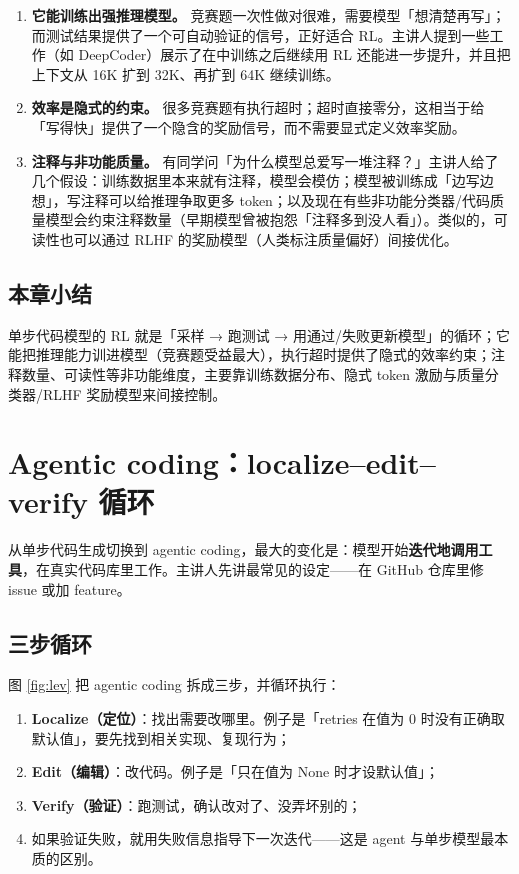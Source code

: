 ﻿\documentclass[a4paper]{article}
\begin{document}
\begin{enumerate}
\item \textbf{它能训练出强推理模型。} 竞赛题一次性做对很难，需要模型「想清楚再写」；而测试结果提供了一个可自动验证的信号，正好适合 RL。主讲人提到一些工作（如 DeepCoder）展示了在中训练之后继续用 RL 还能进一步提升，并且把上下文从 16K 扩到 32K、再扩到 64K 继续训练。
\item \textbf{效率是隐式的约束。} 很多竞赛题有执行超时；超时直接零分，这相当于给「写得快」提供了一个隐含的奖励信号，而不需要显式定义效率奖励。
\item \textbf{注释与非功能质量。} 有同学问「为什么模型总爱写一堆注释？」主讲人给了几个假设：训练数据里本来就有注释，模型会模仿；模型被训练成「边写边想」，写注释可以给推理争取更多 token；以及现在有些非功能分类器/代码质量模型会约束注释数量（早期模型曾被抱怨「注释多到没人看」）。类似的，可读性也可以通过 RLHF 的奖励模型（人类标注质量偏好）间接优化。
\end{enumerate}

\subsection{本章小结}
单步代码模型的 RL 就是「采样 → 跑测试 → 用通过/失败更新模型」的循环；它能把推理能力训进模型（竞赛题受益最大），执行超时提供了隐式的效率约束；注释数量、可读性等非功能维度，主要靠训练数据分布、隐式 token 激励与质量分类器/RLHF 奖励模型来间接控制。

\section{Agentic coding：localize--edit--verify 循环}

从单步代码生成切换到 agentic coding，最大的变化是：模型开始\textbf{迭代地调用工具}，在真实代码库里工作。主讲人先讲最常见的设定——在 GitHub 仓库里修 issue 或加 feature。

\subsection{三步循环}

图 \ref{fig:lev} 把 agentic coding 拆成三步，并循环执行：

\begin{enumerate}
\item \textbf{Localize（定位）}：找出需要改哪里。例子是「retries 在值为 0 时没有正确取默认值」，要先找到相关实现、复现行为；
\item \textbf{Edit（编辑）}：改代码。例子是「只在值为 None 时才设默认值」；
\item \textbf{Verify（验证）}：跑测试，确认改对了、没弄坏别的；
\item 如果验证失败，就用失败信息指导下一次迭代——这是 agent 与单步模型最本质的区别。
\end{enumerate}
\end{document}
